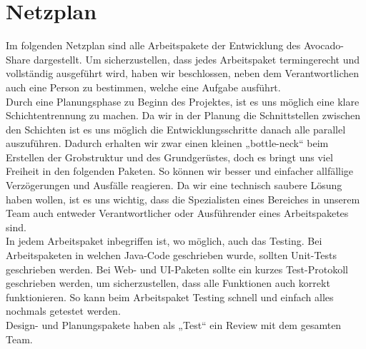 \section{Netzplan}
Im folgenden Netzplan sind alle Arbeitspakete der Entwicklung des Avocado-Share dargestellt. 
Um sicherzustellen, dass jedes Arbeitspaket termingerecht und vollständig ausgeführt wird, haben wir beschlossen, neben dem Verantwortlichen auch eine Person zu bestimmen, welche eine Aufgabe ausführt.\\

Durch eine Planungsphase zu Beginn des Projektes, ist es uns möglich eine klare Schichtentrennung zu machen.
Da wir in der Planung die Schnittstellen zwischen den Schichten ist es uns möglich die Entwicklungsschritte danach
alle parallel auszuführen. Dadurch erhalten wir zwar einen kleinen „bottle-neck“ beim Erstellen der Grobstruktur und des
Grundgerüstes, doch es bringt uns viel Freiheit in den folgenden Paketen. So können wir besser und einfacher allfällige
Verzögerungen und Ausfälle reagieren.
Da wir eine technisch saubere Lösung haben wollen, ist es uns wichtig, dass die Spezialisten eines Bereiches in unserem Team auch entweder Verantwortlicher oder Ausführender eines Arbeitspaketes sind. \\

In jedem Arbeitspaket inbegriffen ist, wo möglich, auch das Testing.
Bei Arbeitspaketen in welchen Java-Code geschrieben wurde, sollten Unit-Tests geschrieben werden.
Bei Web- und UI-Paketen sollte ein kurzes Test-Protokoll geschrieben werden, um sicherzustellen, dass alle Funktionen auch korrekt funktionieren.
So kann beim Arbeitspaket Testing schnell und einfach alles nochmals getestet werden.\\

Design- und Planungspakete haben als „Test“ ein Review mit dem gesamten Team.